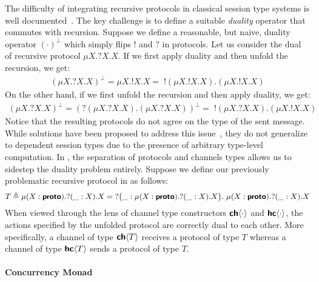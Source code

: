 The difficulty of integrating recursive protocols in classical session type systems
is well documented~\cite{gay20}. The key challenge is to define a suitable \emph{duality}
operator that commutes with recursion. Suppose we define a reasonable, but naive, duality
operator $(\cdot)^\bot$ which simply flips $!$ and $?$ in protocols. Let us consider
the dual of recursive protocol $\mu{X}.{?X}.X$. If we first apply duality and then
unfold the recursion, we get:
\begin{align*}
  (\mu{X}.{?X}.X)^\bot  = \mu{X}.{!X}.X =\; !(\mu{X}.{!X}.X).(\mu{X}.{!X}.X)
\end{align*} 
On the other hand, if we first unfold the recursion and then apply duality, we get:
\begin{align*}
  (\mu{X}.{?X}.X)^\bot = (?(\mu{X}.{?X}.X).(\mu{X}.{?X}.X))^\bot =\; !(\mu{X}.{?X}.X).(\mu{X}.{!X}.X)
\end{align*} 
Notice that the resulting protocols do not agree on the type of the sent message.
While solutions have been proposed to address this issue~\cite{bernardi16,bernardi14},
they do not generalize to dependent session types due to the presence of arbitrary
type-level computation. In \TLLC{}, the separation of protocols and channels types
allows us to sidestep the duality problem entirely. Suppose we define our previously
problematic recursive protocol in \TLLC{} as follows:
\begin{align*}
  T \triangleq \mu({X : \textbf{\textsf{proto}}}).{?(\_ : X). X} =\; ?\big(\_ : \mu({X : \textbf{\textsf{proto}}}).{?(\_ : X). X}\big).\ \mu({X : \textbf{\textsf{proto}}}).{?(\_ : X). X}
\end{align*}
When viewed through the lens of channel type constructors ${\textbf{\textsf{ch}}\langle{\cdot}\rangle}$ and ${\textbf{\textsf{hc}}\langle{\cdot}\rangle}$,
the actions specified by the unfolded protocol are correctly dual to each other.
More specifically, a channel of type ${\textbf{\textsf{ch}}\langle{T}\rangle}$ receives a protocol of type $T$ whereas
a channel of type ${\textbf{\textsf{hc}}\langle{T}\rangle}$ sends a protocol of type $T$.

\paragraph{\textbf{Concurrency Monad}}


